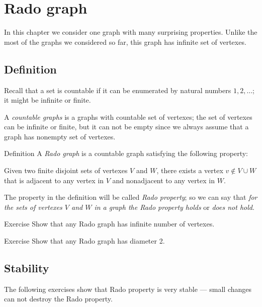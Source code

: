 \chapter{Rado graph}

In this chapter we consider one graph with many surprising properties.
Unlike the most of the graphs we considered so far, this graph has infinite set of vertexes.

\section*{Definition}

Recall that a set is countable if it can be enumerated by natural numbers $1,2,\dots$;
it might be infinite or finite.

A \emph{countable graphs} is a graphs with countable set of vertexes;
the set of vertexes can be infinite or finite, but it can not be empty since we always assume that a graph has nonempty set of vertexes.


\begin{thm}{Definition}
A \emph{Rado graph} is a countable graph satisfying the following property:

Given two finite disjoint sets of vertexes $V$ and $W$, there exists a
vertex $v\notin V\cup W$ that is adjacent to any vertex in $V$ and nonadjacent to any vertex in $W$.
\end{thm}

The property in the definition will be called \emph{Rado property}; so we can say that \emph{for the sets of vertexes $V$ and $W$ in a graph the Rado property holds} or \emph{does not hold}.

\begin{thm}{Exercise}
Show that any Rado graph has infinite number of vertexes. 
\end{thm}

\begin{thm}{Exercise}
Show that any Rado graph has diameter 2.
\end{thm}

\section*{Stability}

The following exercises show that Rado property is very stable --- 
small changes can not destroy the Rado property.


